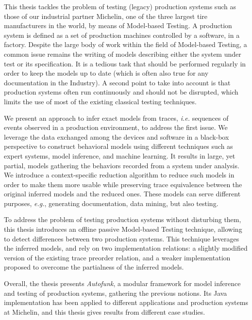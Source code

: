 This thesis tackles the problem of testing (legacy) production
systems such as those of our industrial partner Michelin, one of
the three largest tire manufacturers in the world, by means of
Model-based Testing. A production system is defined as a set of
production machines controlled by a software, in a factory.
Despite the large body of work within the field of Model-based
Testing, a common issue remains the writing of models describing
either the system under test or its specification. It is a
tedious task that should be performed regularly in order to keep
the models up to date (which is often also true for any
documentation in the Industry). A second point to take into
account is that production systems often run continuously and
should not be disrupted, which limits the use of most of the
existing classical testing techniques.

We present an approach to infer exact models from traces,
\emph{i.e.} sequences of events observed in a production
environment, to address the first issue. We leverage the data
exchanged among the devices and software in a black-box
perspective to construct behavioral models using different
techniques such as expert systems, model inference, and machine
learning. It results in large, yet partial, models gathering the
behaviors recorded from a system under analysis. We introduce a
context-specific reduction algorithm to reduce such models in
order to make them more usable while preserving trace equivalence
between the original inferred models and the reduced ones. These
models can serve different purposes, \emph{e.g.}, generating
documentation, data mining, but also testing.

To address the problem of testing production systems without
disturbing them, this thesis introduces an offline passive
Model-based Testing technique, allowing to detect differences
between two production systems. This technique leverages the
inferred models, and rely on two implementation relations: a
slightly modified version of the existing trace preorder
relation, and a weaker implementation proposed to overcome the
partialness of the inferred models.

Overall, the thesis presents \emph{Autofunk}, a modular framework
for model inference and testing of production systems, gathering
the previous notions. Its Java implementation has been applied to
different applications and production systems at Michelin, and
this thesis gives results from different case studies.
